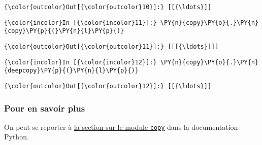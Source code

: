 \begin{Verbatim}[commandchars=\\\{\},frame=single,framerule=0.3mm,rulecolor=\color{cellframecolor}]
{\color{outcolor}Out[{\color{outcolor}10}]:} [[{\ldots}]]
\end{Verbatim}
            
    \begin{Verbatim}[commandchars=\\\{\},frame=single,framerule=0.3mm,rulecolor=\color{cellframecolor}]
{\color{incolor}In [{\color{incolor}11}]:} \PY{n}{copy}\PY{o}{.}\PY{n}{copy}\PY{p}{(}\PY{n}{l}\PY{p}{)}
\end{Verbatim}


\begin{Verbatim}[commandchars=\\\{\},frame=single,framerule=0.3mm,rulecolor=\color{cellframecolor}]
{\color{outcolor}Out[{\color{outcolor}11}]:} [[[{\ldots}]]]
\end{Verbatim}
            
    \begin{Verbatim}[commandchars=\\\{\},frame=single,framerule=0.3mm,rulecolor=\color{cellframecolor}]
{\color{incolor}In [{\color{incolor}12}]:} \PY{n}{copy}\PY{o}{.}\PY{n}{deepcopy}\PY{p}{(}\PY{n}{l}\PY{p}{)}
\end{Verbatim}


\begin{Verbatim}[commandchars=\\\{\},frame=single,framerule=0.3mm,rulecolor=\color{cellframecolor}]
{\color{outcolor}Out[{\color{outcolor}12}]:} [[{\ldots}]]
\end{Verbatim}
            
    \hypertarget{pour-en-savoir-plus}{%
\subsubsection{Pour en savoir plus}\label{pour-en-savoir-plus}}

    On peut se reporter à
\href{https://docs.python.org/3/library/copy.html}{la section sur le
module \texttt{copy}} dans la documentation Python.


    
    
    
